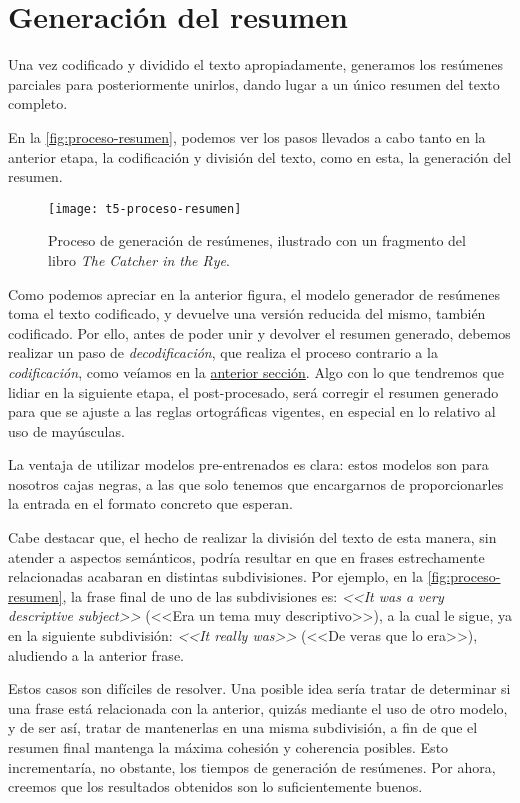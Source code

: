 \newpage

\section{Generación del resumen} \label{sec:resumen}

Una vez codificado y dividido el texto apropiadamente, generamos los resúmenes parciales para posteriormente unirlos, dando lugar a un único resumen del texto completo.

En la \autoref{fig:proceso-resumen}, podemos ver los pasos llevados a cabo tanto en la anterior etapa, la codificación y división del texto, como en esta, la generación del resumen.

\begin{figure}[h]
	\centering
	\texttt{[image: t5-proceso-resumen]}
	\caption{Proceso de generación de resúmenes, ilustrado con un fragmento del libro \emph{The Catcher in the Rye}.}
	\label{fig:proceso-resumen}	
\end{figure}

Como podemos apreciar en la anterior figura, el modelo generador de resúmenes toma el texto codificado, y devuelve una versión reducida del mismo, también codificado. Por ello, antes de poder unir y devolver el resumen generado, debemos realizar un paso de \emph{decodificación}, que realiza el proceso contrario a la \emph{codificación}, como veíamos en la \hyperref[sec:codificacion]{anterior sección}. Algo con lo que tendremos que lidiar en la siguiente etapa, el post-procesado, será corregir el resumen generado para que se ajuste a las reglas ortográficas vigentes, en especial en lo relativo al uso de mayúsculas.

La ventaja de utilizar modelos pre-entrenados es clara: estos modelos son para nosotros cajas negras, a las que solo tenemos que encargarnos de proporcionarles la entrada en el formato concreto que esperan.

Cabe destacar que, el hecho de realizar la división del texto de esta manera, sin atender a aspectos semánticos, podría resultar en que en frases estrechamente relacionadas acabaran en distintas subdivisiones. Por ejemplo, en la \autoref{fig:proceso-resumen}, la frase final de uno de las subdivisiones es: \emph{<<It was a very descriptive subject>>} (<<Era un tema muy descriptivo>>), a la cual le sigue, ya en la siguiente subdivisión: \emph{<<It really was>>} (<<De veras que lo era>>), aludiendo a la anterior frase.

Estos casos son difíciles de resolver. Una posible idea sería tratar de determinar si una frase está relacionada con la anterior, quizás mediante el uso de otro modelo, y de ser así, tratar de mantenerlas en una misma subdivisión, a fin de que el resumen final mantenga la máxima cohesión y coherencia posibles. Esto incrementaría, no obstante, los tiempos de generación de resúmenes. Por ahora, creemos que los resultados obtenidos son lo suficientemente buenos.

